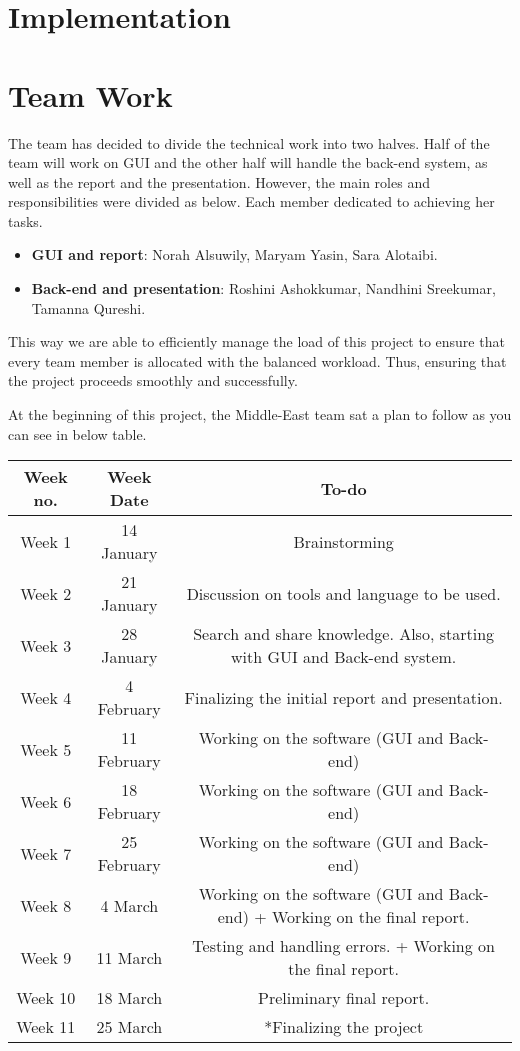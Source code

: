 \documentclass{article}
\begin{document}
\section{Implementation}


\section{Team Work}
The team has decided to divide the technical work into two halves. Half of the team will work on GUI and the other half will handle the back-end system, as well as the report and the presentation. However,  the main roles and responsibilities were divided as below. Each member dedicated to achieving her tasks.
\begin{itemize}

\item \textbf{GUI and report}: Norah Alsuwily, Maryam Yasin, Sara Alotaibi. 
\item \textbf{Back-end and presentation}: Roshini Ashokkumar, Nandhini Sreekumar, Tamanna Qureshi. 
\end{itemize}
This way we are able to efficiently manage the load of this project to ensure that every team member is allocated with the balanced workload. Thus, ensuring that the project proceeds smoothly and successfully.



At the beginning of this project, the Middle-East team sat a plan to follow as you can see in below table. 

\begin{center}
\begin{tabular}{ |c|c|c|} 
\hline
\textbf{Week no.} & \textbf{Week Date } & \textbf{To-do } \\ 
\hline
Week 1 & 14 January  & Brainstorming \\ 
\hline
Week 2 & 21 January  & Discussion  on tools and language to be used. \\ 
\hline

Week 3 & 28 January & Search and share knowledge. 
 Also, starting with GUI and Back-end system. 
 \\ 
\hline
Week 4 & 4 February & Finalizing the initial report and presentation.  \\ 
\hline
Week 5 &  11 February & Working on the software (GUI and Back-end)  \\
\hline
Week 6 & 18  February & Working on the software (GUI and Back-end)   \\ 
\hline
Week 7 & 25  February & Working on the software (GUI and Back-end)   \\ 
\hline
Week 8 & 4 March  & Working on the software (GUI and Back-end) + Working on the final report.   \\ 
\hline
Week 9 & 11 March  & Testing and handling errors. + Working on the final report.   \\ 
\hline
Week 10 & 18 March  & Preliminary final report. \\ 
\hline
Week 11 & 25 March  & *Finalizing the project  \\ 

\hline

\end{tabular}
\end{center}
\end{document}
